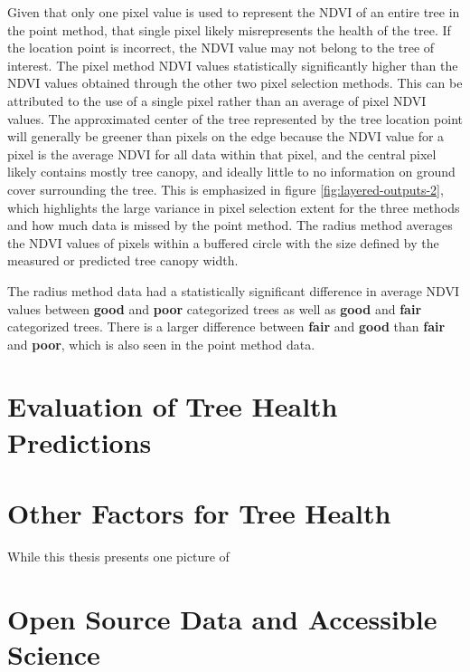 \documentclass[12pt,twoside]{reedthesis}
\begin{document}
Given that only one pixel value is used to represent the NDVI of an
entire tree in the point method, that single pixel likely misrepresents
the health of the tree. If the location point is incorrect, the NDVI
value may not belong to the tree of interest. The pixel method NDVI
values statistically significantly higher than the NDVI values obtained
through the other two pixel selection methods. This can be attributed to
the use of a single pixel rather than an average of pixel NDVI values.
The approximated center of the tree represented by the tree location
point will generally be greener than pixels on the edge because the NDVI
value for a pixel is the average NDVI for all data within that pixel,
and the central pixel likely contains mostly tree canopy, and ideally
little to no information on ground cover surrounding the tree. This is
emphasized in figure \ref{fig:layered-outputs-2}, which highlights the
large variance in pixel selection extent for the three methods and how
much data is missed by the point method. The radius method averages the
NDVI values of pixels within a buffered circle with the size defined by
the measured or predicted tree canopy width.

The radius method data had a statistically significant difference in
average NDVI values between \textbf{good} and \textbf{poor} categorized trees as
well as \textbf{good} and \textbf{fair} categorized trees. There is a larger
difference between \textbf{fair} and \textbf{good} than \textbf{fair} and \textbf{poor},
which is also seen in the point method data.

\hypertarget{evaluation-of-tree-health-predictions}{%
\section{Evaluation of Tree Health Predictions}\label{evaluation-of-tree-health-predictions}}

\hypertarget{other-factors-for-tree-health}{%
\section{Other Factors for Tree Health}\label{other-factors-for-tree-health}}

While this thesis presents one picture of

\hypertarget{open-source-data-and-accessible-science}{%
\section{Open Source Data and Accessible Science}\label{open-source-data-and-accessible-science}}
\end{document}
